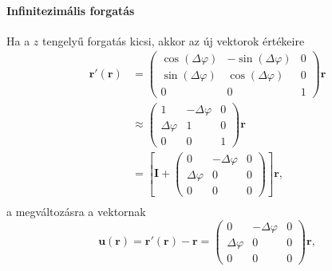\documentclass[12pt,a4paper]{scrartcl}
\let\mathbf\bm
\begin{document}
\paragraph{Infinitezimális forgatás}
Ha a $z$ tengelyű forgatás kicsi, akkor az új vektorok értékeire
\[\begin{aligned}
  {\mathbf{r}}'\left( {\mathbf{r}} \right) &  = \left( {\begin{array}{*{20}{c}}
  {\cos \left( {\Delta \varphi } \right)}&{ - \sin \left( {\Delta \varphi } \right)}&0 \\ 
  {\sin \left( {\Delta \varphi } \right)}&{\cos \left( {\Delta \varphi } \right)}&0 \\ 
  0&0&1 
\end{array}} \right){\mathbf{r}} \\ 
   &  \approx \left( {\begin{array}{*{20}{c}}
  1&{ - \Delta \varphi }&0 \\ 
  {\Delta \varphi }&1&0 \\ 
  0&0&1 
\end{array}} \right){\mathbf{r}} \\ 
   &  = \left[ {{\mathbf{I}} + \left( {\begin{array}{*{20}{c}}
  0&{ - \Delta \varphi }&0 \\ 
  {\Delta \varphi }&0&0 \\ 
  0&0&0 
\end{array}} \right)} \right]{\mathbf{r}}, \\ 
\end{aligned} \]
a megváltozásra a vektornak
\begin{equation} \label{eq:inf_forgat_u}
{\mathbf{u}}\left( {\mathbf{r}} \right) = {\mathbf{r}}'\left( {\mathbf{r}} \right) - {\mathbf{r}} = \left( {\begin{array}{*{20}{c}}
  0&{ - \Delta \varphi }&0 \\ 
  \Delta \varphi &0&0 \\ 
  0&0&0 
\end{array}} \right){\mathbf{r}},
\end{equation}
\end{document}
